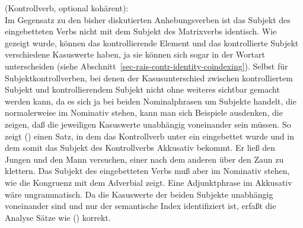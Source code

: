 {\eas
\label{le-versuchen-incoh}%
 (Kontrollverb, optional kohärent):\\
\onems{
cat$|$comps  \sliste{ NP[\type{str}]\ind{1}  } $\oplus$ \ibox{2} $\oplus$ \sliste{ \textrm{V[}%
\begin{tabular}[t]{@{}l@{}}
                                   \type{inf}, \textsc{subj} \sliste{NP[\type{str}]\ind{1}},\\
                                   \textsc{comps}~\ibox{2} ]:\ibox{3}\\
                                   \end{tabular}
         }\\
cont \ms[versuchen]{
        agens       & \ibox{1}\\
        soa & \ibox{3}\\
       }\\
}%
\zs
Im Gegensatz zu den bisher diskutierten Anhebungsverben ist das Subjekt des eingebetteten Verbs
nicht mit dem Subjekt des Matrixverbs identisch. Wie gezeigt wurde, können das kontrollierende
Element und das kontrollierte Subjekt verschiedene Kasuswerte haben, ja sie können sich sogar
in der Wortart unterscheiden (siehe Abschnitt~\ref{sec-rais-contr-identity-coindexing}).
Selbst für Subjektkontrollverben, bei denen der Kasusunterschied zwischen kontrolliertem
Subjekt und kontrollierendem Subjekt nicht ohne weiteres sichtbar gemacht werden kann, da
es sich ja bei beiden Nominalphrasen um Subjekte handelt, die normalerweise im Nominativ
stehen, kann man sich Beispiele ausdenken, die zeigen, daß die jeweiligen Kasuswerte
unabhängig voneinander sein müssen. So zeigt () einen Satz, in dem das Kontrollverb
unter ein \aciv eingebettet wurde und in dem somit das Subjekt des Kontrollverbs Akkusativ bekommt.
%
%
\ea
Er ließ den Jungen und den Mann versuchen, einer nach dem anderen über den Zaun zu klettern.
\z
Das Subjekt des eingebetteten Verbs muß aber im Nominativ stehen, wie die Kongruenz mit dem Adverbial zeigt.
Eine Adjunktphrase im Akkusativ wäre ungrammatisch. Da die Kasuswerte der beiden Subjekte unabhängig voneinander sind
und nur der semantische Index identifiziert ist, erfaßt die Analyse Sätze wie () korrekt.

}
